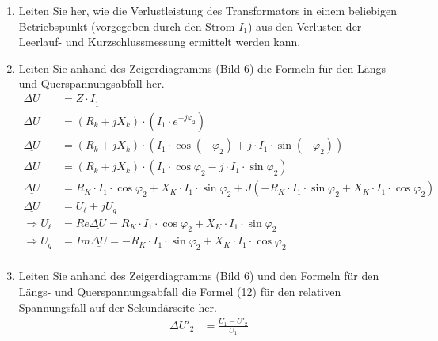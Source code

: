 \begin{enumerate}[label=\alph*)]
  \item Leiten Sie her, wie die Verlustleistung des Transformators in einem beliebigen
        Betriebspunkt (vorgegeben durch den Strom $I_1$) aus den Verlusten der
        Leerlauf- und Kurzschlussmessung ermittelt werden kann.
  \item Leiten Sie anhand des Zeigerdiagramms (Bild 6) die Formeln für den Längs- und
        Querspannungsabfall her.
        \begin{align*}
          \underline{\Delta U} & = \underline Z\cdot \underline I_1                                                                                                        \\
          \underline{\Delta U} & = (R_k+ jX_k)\cdot (I_1\cdot e^{-j\varphi_2})                                                                                             \\
          \underline{\Delta U} & = (R_k+ jX_k)\cdot \left(I_1\cdot\cos(-\varphi_2)+j\cdot I_1\cdot \sin(-\varphi_2)\right)                                                 \\
          \underline{\Delta U} & = (R_k+ jX_k)\cdot \left(I_1\cdot\cos\varphi_2-j\cdot I_1\cdot \sin\varphi_2\right)                                                       \\
          \underline{\Delta U} & = R_K\cdot I_1\cdot \cos\varphi_2 + X_K\cdot I_1 \cdot \sin\varphi_2+J(-R_K\cdot I_1 \cdot \sin\varphi_2+X_K\cdot I_1\cdot \cos\varphi_2) \\
          \underline{\Delta U} & = U_\ell +jU_q                                                                                                                            \\
          \Rightarrow U_\ell   & =Re{\underline{\Delta U}}=R_K\cdot I_1 \cdot\cos \varphi_2 + X_K \cdot I_1\cdot \sin \varphi_2                                            \\
          \Rightarrow U_q      & =Im{\underline{\Delta U}}= -R_K\cdot I_1 \cdot\sin \varphi_2 + X_K \cdot I_1\cdot \cos \varphi_2                                          \\
        \end{align*}
  \item Leiten Sie anhand des Zeigerdiagramms (Bild 6) und den Formeln für den Längs-
        und Querspannungsabfall die Formel (12) für den relativen Spannungsfall auf der
        Sekundärseite her.
        \begin{align*}
          \Delta U'_2                            & = \frac{U_1 - U'_2}{U_1}                                                                                                \\

\end{align*}
\end{enumerate}
